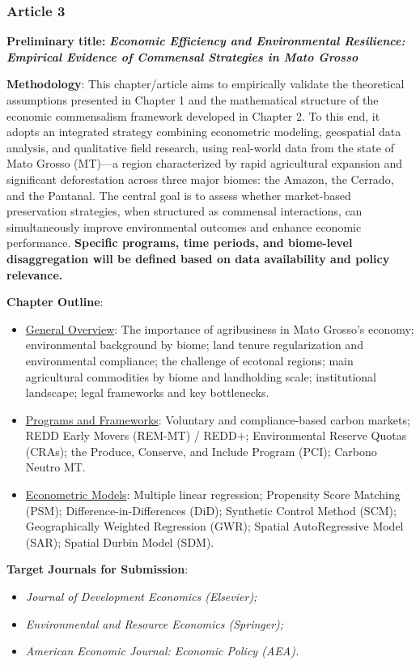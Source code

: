 \subsubsection{Article 3}

\textbf{Preliminary title:} \emph{\textbf{Economic Efficiency and Environmental Resilience: Empirical Evidence of Commensal Strategies in Mato Grosso}}

\textbf{Methodology}: This chapter/article aims to empirically validate the theoretical assumptions presented in Chapter 1 and the mathematical structure of the economic commensalism framework developed in Chapter 2. To this end, it adopts an integrated strategy combining econometric modeling, geospatial data analysis, and qualitative field research, using real-world data from the state of Mato Grosso (MT)—a region characterized by rapid agricultural expansion and significant deforestation across three major biomes: the Amazon, the Cerrado, and the Pantanal. The central goal is to assess whether market-based preservation strategies, when structured as commensal interactions, can simultaneously improve environmental outcomes and enhance economic performance. \textbf{Specific programs, time periods, and biome-level disaggregation will be defined based on data availability and policy relevance.}

\textbf{Chapter Outline}:
\begin{itemize}
    \item[i.] \underline{General Overview}: The importance of agribusiness in Mato Grosso’s economy; environmental background by biome; land tenure regularization and environmental compliance; the challenge of ecotonal regions; main agricultural commodities by biome and landholding scale; institutional landscape; legal frameworks and key bottlenecks.
    \item[ii.] \underline{Programs and Frameworks}: Voluntary and compliance-based carbon markets; REDD Early Movers (REM-MT) / REDD+; Environmental Reserve Quotas (CRAs); the Produce, Conserve, and Include Program (PCI); Carbono Neutro MT.
    \item[iii.] \underline{Econometric Models}: Multiple linear regression; Propensity Score Matching (PSM); Difference-in-Differences (DiD); Synthetic Control Method (SCM); Geographically Weighted Regression (GWR); Spatial AutoRegressive Model (SAR); Spatial Durbin Model (SDM).
\end{itemize}

\textbf{Target Journals for Submission}:
\begin{itemize}
    \item[a)] \textit{Journal of Development Economics (Elsevier);}\
    \item[b)] \textit{Environmental and Resource Economics (Springer);}\
    \item[c)] \textit{American Economic Journal: Economic Policy (AEA).}
\end{itemize}

\newpage

